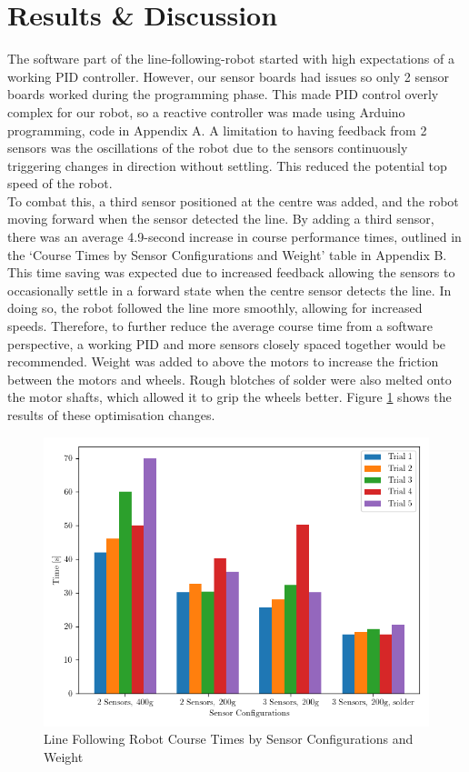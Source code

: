 \section{Results \& Discussion}
The software part of the line-following-robot started with high expectations of a working PID controller. However, our sensor boards had issues so only 2 sensor boards worked during the programming phase. This made PID control overly complex for our robot, so a reactive controller was made using Arduino programming, code in Appendix A. A limitation to having feedback from 2 sensors was the oscillations of the robot due to the sensors continuously triggering changes in direction without settling. This reduced the potential top speed of the robot. 
\\

To combat this, a third sensor positioned at the centre was added, and the robot moving forward when the sensor detected the line. By adding a third sensor, there was an average 4.9-second increase in course performance times, outlined in the ‘Course Times by Sensor Configurations and Weight’ table in Appendix B. This time saving was expected due to increased feedback allowing the sensors to occasionally settle in a forward state when the centre sensor detects the line. In doing so, the robot followed the line more smoothly, allowing for increased speeds. Therefore, to further reduce the average course time from a software perspective, a working PID and more sensors closely spaced together would be recommended. Weight was added to above the motors to increase the friction between the motors and wheels. Rough blotches of solder were also melted onto the motor shafts, which allowed it to grip the wheels better. Figure \ref{fig:Trialchart} shows the results of these optimisation changes. 

\begin{figure}[H]
    \centering
    \includegraphics[width=0.5\linewidth]{REPORT/plotv3.png}
    \caption{Line Following Robot Course Times by Sensor Configurations and Weight }
    \label{fig:Trialchart}
\end{figure}

